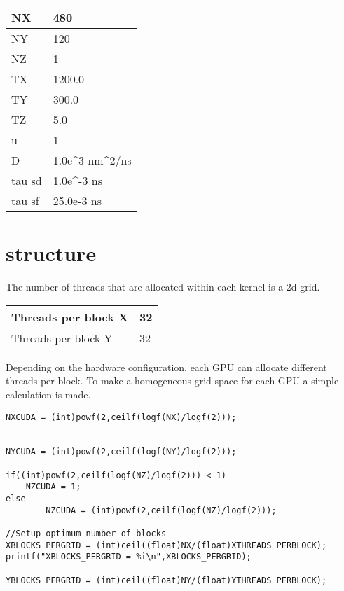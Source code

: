 \begin{table}[h]
\centering
\begin{tabular}{| l | l |}
\hline
NX     & 480                                            \\
\hline
NY     & 120                                            \\
\hline
NZ     & 1                                              \\
\hline
TX     & 1200.0                                         \\
\hline
TY     & 300.0                                          \\
\hline
TZ     & 5.0                                            \\
\hline
u      & 1                                              \\
\hline
D      & 1.0e\textasciicircum 3 nm\textasciicircum 2/ns \\
\hline
tau sd & 1.0e\textasciicircum -3 ns                     \\
\hline
tau sf & 25.0e-3 ns      \\
\hline
\end{tabular}
\end{table}


\section{structure}

The number of threads that are allocated within each kernel is a 2d grid.

\begin{table}[h]
\centering
\begin{tabular}{| l | l |}
\hline
Threads per block  X   & 32       \\
\hline
Threads per block Y     & 32         \\
\hline
\end{tabular}
\end{table}

Depending on the hardware configuration, each GPU can allocate different threads per block. To make a homogeneous grid space for each GPU a simple calculation is made.

\begin{lstlisting}[frame=none]
NXCUDA = (int)powf(2,ceilf(logf(NX)/logf(2)));


NYCUDA = (int)powf(2,ceilf(logf(NY)/logf(2)));

if((int)powf(2,ceilf(logf(NZ)/logf(2))) < 1)
	NZCUDA = 1;
else
        NZCUDA = (int)powf(2,ceilf(logf(NZ)/logf(2)));

//Setup optimum number of blocks
XBLOCKS_PERGRID = (int)ceil((float)NX/(float)XTHREADS_PERBLOCK);
printf("XBLOCKS_PERGRID = %i\n",XBLOCKS_PERGRID);

YBLOCKS_PERGRID = (int)ceil((float)NY/(float)YTHREADS_PERBLOCK);
\end{lstlisting}


